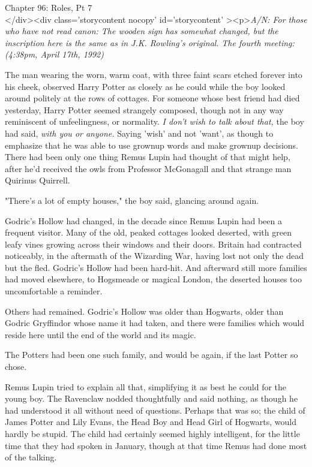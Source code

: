 
Chapter 96: Roles, Pt 7\\
</div><div  class='storycontent nocopy' id='storycontent' ><p>\emph{A/N: For 
those who have not read canon: The wooden sign has somewhat changed, but the 
inscription here is the same as in J.K. Rowling's original.}
\sbreak
\emph{The fourth meeting:\\
(4:38pm, April 17th, 1992)}

The man wearing the worn, warm coat, with three faint scars etched forever into 
his cheek, observed Harry Potter as closely as he could while the boy looked 
around politely at the rows of cottages. For someone whose best friend had died 
yesterday, Harry Potter seemed strangely composed, though not in any way 
reminiscent of unfeelingness, or normality. \emph{I don't wish to talk about 
that,} the boy had said, \emph{with you or anyone.} Saying 'wish' and not 
'want', as though to emphasize that he was able to use grownup words and make 
grownup decisions. There had been only one thing Remus Lupin had thought of 
that might help, after he'd received the owls from Professor McGonagall and 
that strange man Quirinus Quirrell.

"There's a lot of empty houses," the boy said, glancing around again.

Godric's Hollow had changed, in the decade since Remus Lupin had been a 
frequent visitor. Many of the old, peaked cottages looked deserted, with green 
leafy vines growing across their windows and their doors. Britain had 
contracted noticeably, in the aftermath of the Wizarding War, having lost not 
only the dead but the fled. Godric's Hollow had been hard-hit. And afterward 
still more families had moved elsewhere, to Hogsmeade or magical London, the 
deserted houses too uncomfortable a reminder.

Others had remained. Godric's Hollow was older than Hogwarts, older than Godric 
Gryffindor whose name it had taken, and there were families which would reside 
here until the end of the world and its magic.

The Potters had been one such family, and would be again, if the last Potter so 
chose.

Remus Lupin tried to explain all that, simplifying it as best he could for the 
young boy. The Ravenclaw nodded thoughtfully and said nothing, as though he had 
understood it all without need of questions. Perhaps that was so; the child of 
James Potter and Lily Evans, the Head Boy and Head Girl of Hogwarts, would 
hardly be stupid. The child had certainly seemed highly intelligent, for the 
little time that they had spoken in January, though at that time Remus had done 
most of the talking.

